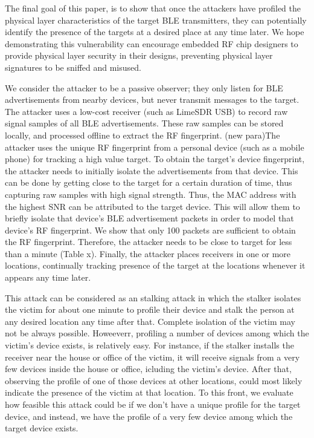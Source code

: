 
The final goal of this paper, is to show that once the attackers have profiled the physical layer characteristics of the target BLE transmitters, they can potentially identify the presence of the targets at a desired place at any time later. We hope demonstrating this vulnerability can encourage embedded RF chip designers to provide physical layer security in their designs, preventing physical layer signatures to be sniffed and misused.



\color{blue} {We consider the attacker to be a passive observer; they only listen for BLE advertisements from nearby devices, but never transmit messages to the target. The attacker uses a low-cost receiver (such as LimeSDR USB) to record raw signal samples of all BLE advertisements. These raw samples can be stored locally, and processed offline to extract the RF fingerprint. (new para)The attacker uses the unique RF fingerprint from a personal device (such as a mobile phone) for tracking a high value target. To obtain the target's device fingerprint, the attacker needs to initially isolate the advertisements from that device. This can be done by getting close to the target for a certain duration of time, thus capturing raw samples with high signal strength. Thus, the MAC address with the highest SNR can be attributed to the target device. This will allow them to briefly isolate that device's BLE advertisement packets in order to model that device's RF fingerprint. We show that only 100 packets are sufficient to obtain the RF fingerprint. Therefore, the attacker needs to be close to target for less than a minute (Table x). Finally, the attacker places receivers in one or more locations, continually tracking presence of the target at the locations whenever it appears any time later.

This attack can be considered as an stalking attack in which the stalker isolates the victim for about one minute to profile their device and stalk the person at any desired location any time after that. Complete isolation of the victim may not be always possible. Howeeverr, profiling a number of devices among which the victim's device exists, is relatively easy. For instance, if the stalker installs the receiver near the house or office of the victim, it will receive signals from a very few devices inside the house or office, icluding the victim's device. After that, observing the profile of one of those devices at other locations, could most likely indicate the presence of the victim at that location. To this front, we evaluate how feasible this attack could be if we don't have a unique profile for the target device, and instead, we have the profile of a very few device among which the target device exists.}

